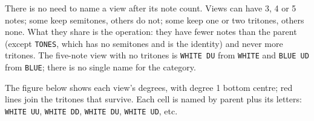 \documentclass[]{report}
\begin{document}
There is no need to name a view after its note count. Views can have 3, 4 or 5
notes; some keep semitones, others do not; some keep one or two tritones, others
none. What they share is the operation: they have fewer notes than the parent
(except \texttt{TONES}, which has no semitones and is the identity) and never
more tritones. The five-note view with no tritones is \texttt{WHITE DU} from
\texttt{WHITE} and \texttt{BLUE UD} from \texttt{BLUE}; there is no single name
for the category.

The figure below shows each view's degrees, with degree 1 bottom centre; red
lines join the tritones that survive. Each cell is named by parent plus its
letters: \texttt{WHITE UU}, \texttt{WHITE DD}, \texttt{WHITE DU}, \texttt{WHITE
UD}, etc.

\newcommand{\collapsedviewcoord}[1]{%
	\ifcase#1
		0.5,0\or0,0\or0,0.5\or0,1\or0,1.5\or0,2%
		\or0.5,2\or1,2\or1,1.5\or1,1\or1,0.5\or1,0%
	\fi}

\newcommand{\collapsedviewbody}[1]{%
	\foreach \val [count=\i from 0] in {#1} {
		\ifnum\val=0
			\node at (\collapsedviewcoord{\i}) [st=white] {};
		\else
			\node at (\collapsedviewcoord{\i}) [st] {\val};
		\fi
	}}

\newcommand{\collapsedviewx}[1]{%
	\ifcase#1 0.5\or0\or0\or0\or0\or0\or0.5\or1\or1\or1\or1\or1\fi}
\newcommand{\collapsedviewy}[1]{%
	\ifcase#1 0\or0\or0.5\or1\or1.5\or2\or2\or2\or1.5\or1\or0.5\or0\fi}

\newcommand{\collapsedviewtritones}[1]{%
	\foreach \a/\b in {#1} {
		\pgfmathsetmacro{\ax}{\collapsedviewx{\a}}
		\pgfmathsetmacro{\ay}{\collapsedviewy{\a}}
		\pgfmathsetmacro{\bx}{\collapsedviewx{\b}}
		\pgfmathsetmacro{\by}{\collapsedviewy{\b}}
		\ifdim\ax pt=\bx pt
			\draw[very thick, color=red]
				(\ax,\ay+0.25) -- (\bx,\by-0.25);
		\else
			\draw[very thick, color=red]
				(\ax+0.25,\ay) -- (\bx-0.25,\by);
		\fi
	}}

\newcommand{\collapsedviewgrid}[4]{%
	\begin{scope}[shift={(#1,#2)}]
		\collapsedviewbody{#3}
		\collapsedviewtritones{#4}
	\end{scope}}
\end{document}
